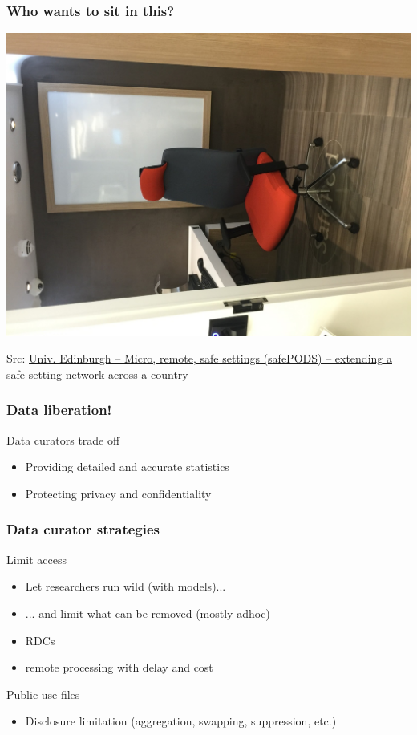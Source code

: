 \begin{frame}
	\frametitle{Who wants to sit in this?}
		\centering 
		\includegraphics[height=0.6\textheight,angle=270]{SafePODS2}
		
	\tiny Src: \href{http://www1.unece.org/stat/platform/display/SDCWS15/}{Univ. Edinburgh -- Micro, remote, safe settings (safePODS) -- extending a safe setting network across a country}
\end{frame}



\begin{frame}
	\frametitle{Data liberation!}
{\Large Data curators trade off}
\begin{itemize}
	\item Providing detailed and accurate statistics 
	\item Protecting privacy and confidentiality 
\end{itemize}
\end{frame}

\begin{frame}
	\frametitle{Data curator strategies}
	\begin{block}{Limit access}
		\begin{itemize}
		    \item Let researchers run wild (with models)...
			\item ... and limit what can be removed (mostly adhoc)
			\item RDCs
			\item remote processing with delay and cost
		\end{itemize}
	\end{block}
	\begin{block}{Public-use files}
\begin{itemize}
	\item Disclosure limitation (aggregation, swapping, suppression, etc.)
\end{itemize}
	\end{block}
\end{frame}

